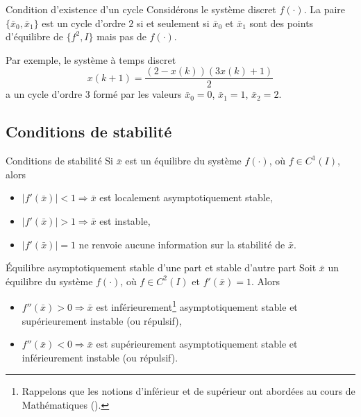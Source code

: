             \begin{theorem}{Condition d'existence d'un cycle}
                Considérons le système discret $f(\cdot)$. La paire $\{\bar{x}_0, \bar{x}_1\}$ est un cycle d'ordre $2$ si et seulement si $\bar{x}_0$ et $\bar{x}_1$ sont des points d'équilibre de $\{f^2, I\}$ mais pas de $f(\cdot)$.
            \end{theorem}
            Par exemple, le système à temps discret
            \begin{equation}
                x(k + 1) = \frac{(2 - x(k))(3x(k) + 1)}{2}
            \end{equation}
            a un cycle d’ordre $3$ formé par les valeurs $\bar{x}_0 = 0$, $\bar{x}_1 = 1$, $\bar{x}_2 = 2$.
        \subsection{Conditions de stabilité}
        \begin{theorem}{Conditions de stabilité}
            Si $\bar{x}$ est un équilibre du système $f(\cdot)$, où $f \in C^1(I)$, alors
            \begin{itemize}
                \item $|f'(\bar{x})| < 1 \Rightarrow \bar{x}$ est localement asymptotiquement stable,
                \item $|f'(\bar{x})| > 1 \Rightarrow \bar{x}$ est instable,
                \item $|f'(\bar{x})| = 1$ ne renvoie aucune information sur la stabilité de $\bar{x}$.
            \end{itemize}
        \end{theorem}
        \begin{theorem}{Équilibre asymptotiquement stable d'une part et stable d'autre part}
            Soit $\bar{x}$ un équilibre du système $f(\cdot)$, où $f \in C^2(I)$ et $f'(\bar{x}) = 1$. Alors
            \begin{itemize}
                \item $f''(\bar{x}) > 0 \Rightarrow \bar{x}$ est inférieurement\footnote{Rappelons que les notions d'inférieur et de supérieur ont abordées au cours de Mathématiques (\cite{mathf117}).} asymptotiquement stable et supérieurement instable (ou répulsif),
                \item $f''(\bar{x}) < 0 \Rightarrow \bar{x}$ est supérieurement asymptotiquement stable et inférieurement instable (ou répulsif).
            \end{itemize}
        \end{theorem}

